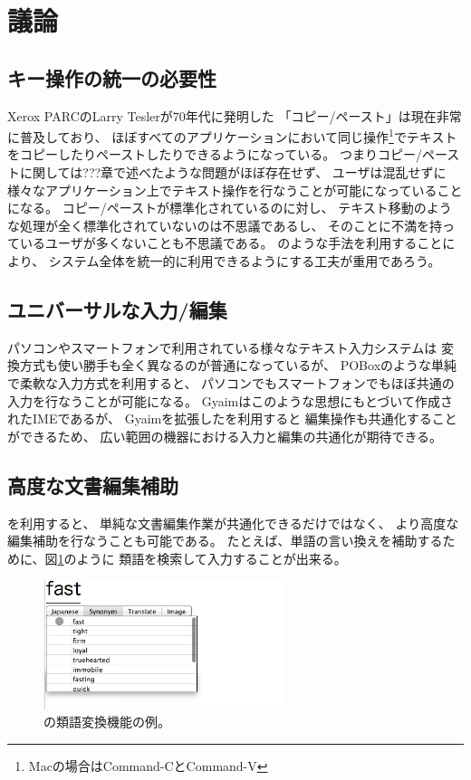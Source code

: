 \section{議論}

\subsection{キー操作の統一の必要性}

Xerox PARCのLarry Teslerが70年代に発明した\cite{Tesler:CopyPaste}
「コピー/ペースト」は現在非常に普及しており、
ほぼすべてのアプリケーションにおいて同じ操作\footnote{
  Macの場合はCommand-CとCommand-V
}でテキストをコピーしたりペーストしたりできるようになっている。
つまりコピー/ペーストに関しては???章で述べたような問題がほぼ存在せず、
ユーザは混乱せずに様々なアプリケーション上でテキスト操作を行なうことが可能になっていることになる。
コピー/ペーストが標準化されているのに対し、
テキスト移動のような処理が全く標準化されていないのは不思議であるし、
そのことに不満を持っているユーザが多くないことも不思議である。
{\system}のような手法を利用することにより、
システム全体を統一的に利用できるようにする工夫が重用であろう。

\subsection{ユニバーサルな入力/編集}

パソコンやスマートフォンで利用されている様々なテキスト入力システムは
変換方式も使い勝手も全く異なるのが普通になっているが、
POBox\cite{Masui:POBox}のような単純で柔軟な入力方式を利用すると、
パソコンでもスマートフォンでもほぼ共通の入力を行なうことが可能になる。
Gyaimはこのような思想にもとづいて作成されたIMEであるが、
Gyaimを拡張した{\system}を利用すると
編集操作も共通化することができるため、
広い範囲の機器における入力と編集の共通化が期待できる。

\subsection{高度な文書編集補助}

{\system}を利用すると、
単純な文書編集作業が共通化できるだけではなく、
より高度な編集補助を行なうことも可能である。
たとえば、単語の言い換えを補助するために、図\ref{synonym}のように
類語を検索して入力することが出来る。

\begin{figure}[H]
\centerline{\includegraphics[width=70mm,bb=0 0 350 250]{figures/synonym.png}}
\caption{{\system}の類語変換機能の例。}
\label{synonym}
\end{figure}

